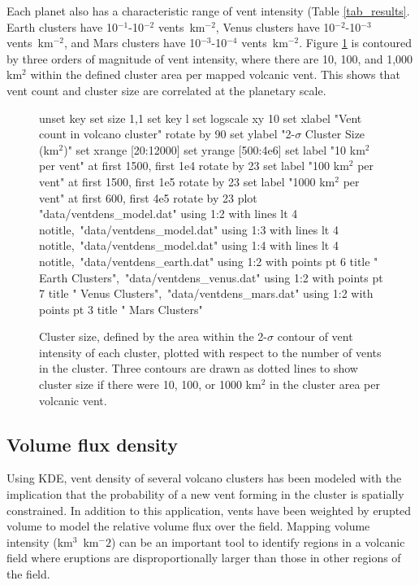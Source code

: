 Each planet also has a characteristic range of vent intensity (Table \ref{tab_results}. Earth clusters have 10$^{-1}$-10$^{-2}$ vents~km$^{-2}$, Venus clusters have 10$^{-2}$-10$^{-3}$ vents~km$^{-2}$, and Mars clusters have 10$^{-3}$-10$^{-4}$ vents~km$^{-2}$. Figure \ref{fig_ventdens} is contoured by three orders of magnitude of vent intensity, where there are 10, 100, and 1,000 km$^2$ within the defined cluster area per mapped volcanic vent. This shows that vent count and cluster size are correlated at the planetary scale.

\begin{figure}[h!]
	\centering
	\begin{gnuplot}[terminal=latex, terminaloptions=rotate]
		unset key
		set size 1,1
		set key l
		set logscale xy 10
		set xlabel "Vent count in volcano cluster" rotate by 90
		set ylabel "2-$\sigma$ Cluster Size (km$^2$)"
		set xrange [20:12000]
		set yrange [500:4e6]
		set label "10 km$^2$ per vent" at first 1500, first 1e4 rotate by 23
		set label "100 km$^2$ per vent" at first 1500, first 1e5 rotate by 23
		set label "1000 km$^2$ per vent" at first 600, first 4e5 rotate by 23
		plot "data/ventdens_model.dat" using 1:2 with lines lt 4 notitle,\
		"data/ventdens_model.dat" using 1:3 with lines lt 4 notitle,\
		"data/ventdens_model.dat" using 1:4 with lines lt 4 notitle,\
		"data/ventdens_earth.dat" using 1:2 with points pt 6 title "  Earth Clusters",\
		"data/ventdens_venus.dat" using 1:2 with points pt 7 title "  Venus Clusters",\
		"data/ventdens_mars.dat" using 1:2 with points pt 3 title "  Mars Clusters"
	\end{gnuplot}
	\caption[Cluster size, defined by the area within the 2-$\sigma$ contour of vent intensity of each cluster, plotted with respect to the number of vents in the cluster]{Cluster size, defined by the area within the 2-$\sigma$ contour of vent intensity of each cluster, plotted with respect to the number of vents in the cluster. Three contours are drawn as dotted lines to show cluster size if there were 10, 100, or 1000 km$^2$ in the cluster area per volcanic vent.}
	\label{fig_ventdens}
\end{figure}
	

\subsection{Volume flux density}
Using KDE, vent density of several volcano clusters has been modeled with the implication that the probability of a new vent forming in the cluster is spatially constrained. In addition to this application, vents have been weighted by erupted volume to model the relative volume flux over the field. Mapping volume intensity (km$^3$~km$^-2$) can be an important tool to identify regions in a volcanic field where eruptions are disproportionally larger than those in other regions of the field.

